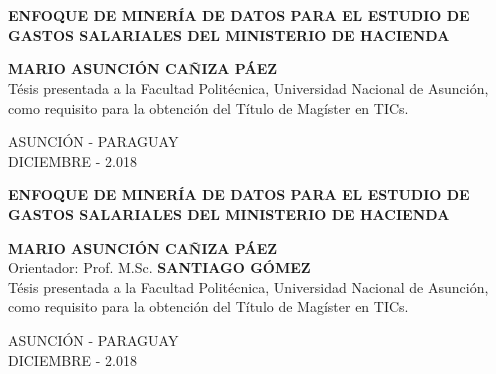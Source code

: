 \thispagestyle{empty}
\section*{}
\begin{large}
	\centering \textbf{ENFOQUE DE MINER\'IA DE DATOS PARA EL ESTUDIO DE 	 GASTOS SALARIALES DEL MINISTERIO DE HACIENDA} \\
\end{large}
\vspace{3cm}
\begin{large}
	\centering \textbf{MARIO ASUNCI\'ON CAÑIZA P\'AEZ}\\
    \vspace{3,5cm}
  	T\'esis presentada a la Facultad Polit\'ecnica, Universidad Nacional de Asunci\'on, como requisito para la obtenci\'on del T\'itulo de Mag\'ister en TICs. \\
\end{large}
\vspace*{1.9in}
\centering ASUNCI\'ON - PARAGUAY\\
\centering DICIEMBRE - 2.018
\newpage
\thispagestyle{empty}
\begin{large}
	\centering \textbf{ENFOQUE DE MINER\'IA DE DATOS PARA EL ESTUDIO DE 	 GASTOS SALARIALES DEL MINISTERIO DE HACIENDA} \\
\end{large}
\vspace{3cm}
\begin{large}
	\centering \textbf{MARIO ASUNCI\'ON CAÑIZA P\'AEZ}\\
    \vspace{3,5cm}
	Orientador: Prof. M.Sc. \textbf{SANTIAGO G\'OMEZ} \\
  	\vspace{3cm}
  	T\'esis presentada a la Facultad Polit\'ecnica, Universidad Nacional de Asunci\'on, como requisito para la obtenci\'on del T\'itulo de Mag\'ister en TICs. \\
\end{large}
\vspace*{1.9in}
\centering ASUNCI\'ON - PARAGUAY\\
\centering DICIEMBRE - 2.018

